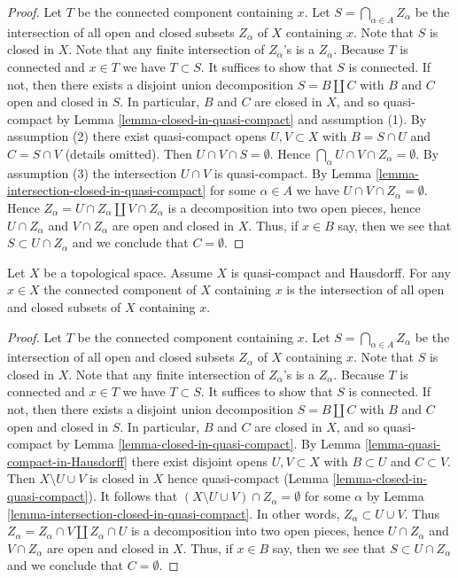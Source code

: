 \begin{proof}
Let $T$ be the connected component containing $x$.
Let $S = \bigcap_{\alpha \in A} Z_\alpha$ be the intersection of all
open and closed subsets $Z_\alpha$ of $X$ containing $x$.
Note that $S$ is closed in $X$.
Note that any finite intersection of $Z_\alpha$'s is a $Z_\alpha$.
Because $T$ is connected and $x \in T$ we have $T \subset S$.
It suffices to show that $S$ is connected.
If not, then there exists a disjoint union decomposition
$S = B \coprod C$ with $B$ and $C$ open and closed in $S$.
In particular, $B$ and $C$ are closed in $X$, and so quasi-compact by
Lemma \ref{lemma-closed-in-quasi-compact} and assumption (1).
By assumption (2) there exist quasi-compact opens
$U, V \subset X$ with $B = S \cap U$ and $C = S \cap V$ (details omitted).
Then $U \cap V \cap S = \emptyset$.
Hence $\bigcap_\alpha U \cap V \cap Z_\alpha = \emptyset$.
By assumption (3) the intersection $U \cap V$ is quasi-compact.
By Lemma \ref{lemma-intersection-closed-in-quasi-compact}
for some $\alpha \in A$ we have $U \cap V \cap Z_\alpha = \emptyset$.
Hence $Z_\alpha = U \cap Z_\alpha \coprod V \cap Z_\alpha$
is a decomposition into two open pieces,
hence $U \cap Z_\alpha$ and $V \cap Z_\alpha$ are open and closed in $X$.
Thus, if $x \in B$ say, then we see that $S \subset U \cap Z_\alpha$
and we conclude that $C = \emptyset$.
\end{proof}

\begin{lemma}
\label{lemma-connected-component-intersection-compact-Hausdorff}
Let $X$ be a topological space. Assume $X$ is quasi-compact and Hausdorff.
For any $x \in X$ the connected component of $X$ containing
$x$ is the intersection of all open and closed subsets
of $X$ containing $x$.
\end{lemma}

\begin{proof}
Let $T$ be the connected component containing $x$.
Let $S = \bigcap_{\alpha \in A} Z_\alpha$ be the intersection of all
open and closed subsets $Z_\alpha$ of $X$ containing $x$.
Note that $S$ is closed in $X$.
Note that any finite intersection of $Z_\alpha$'s is a $Z_\alpha$.
Because $T$ is connected and $x \in T$ we have $T \subset S$.
It suffices to show that $S$ is connected.
If not, then there exists a disjoint union decomposition
$S = B \coprod C$ with $B$ and $C$ open and closed in $S$.
In particular, $B$ and $C$ are closed in $X$, and so quasi-compact by
Lemma \ref{lemma-closed-in-quasi-compact}.
By Lemma \ref{lemma-quasi-compact-in-Hausdorff}
there exist disjoint opens $U, V \subset X$ with $B \subset U$ and
$C \subset V$. Then $X \setminus U \cup V$ is closed in $X$
hence quasi-compact (Lemma \ref{lemma-closed-in-quasi-compact}).
It follows that $(X \setminus U \cup V) \cap Z_\alpha = \emptyset$
for some $\alpha$ by Lemma \ref{lemma-intersection-closed-in-quasi-compact}.
In other words, $Z_\alpha \subset U \cup V$. Thus
$Z_\alpha = Z_\alpha \cap V \amalg Z_\alpha \cap U$
is a decomposition into two open pieces,
hence $U \cap Z_\alpha$ and $V \cap Z_\alpha$ are open and closed in $X$.
Thus, if $x \in B$ say, then we see that $S \subset U \cap Z_\alpha$
and we conclude that $C = \emptyset$.
\end{proof}

